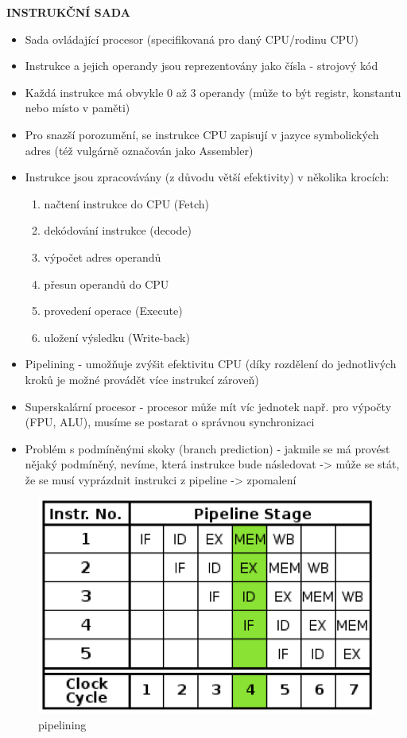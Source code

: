 \documentclass[10pt,a4paper]{article}
\begin{document}
\textbf{INSTRUKČNÍ SADA}
\begin{itemize}
	\item Sada ovládající procesor (specifikovaná pro daný CPU/rodinu CPU)
	\item Instrukce a jejich operandy jsou reprezentovány jako čísla - strojový kód
	\item Každá instrukce má obvykle 0 až 3 operandy (může to být registr, konstantu nebo místo v paměti)
	\item Pro snazší porozumění, se instrukce CPU zapisují v jazyce symbolických adres (též vulgárně označován jako Assembler)
	\item Instrukce jsou zpracovávány (z důvodu větší efektivity) v několika krocích:
	\begin{enumerate}
		\item načtení instrukce do CPU (Fetch)
		\item dekódování instrukce (decode)
		\item výpočet adres operandů
		\item přesun operandů do CPU
		\item provedení operace (Execute)
		\item uložení výsledku (Write-back)
	\end{enumerate}
	\item Pipelining - umožňuje zvýšit efektivitu CPU (díky rozdělení do jednotlivých kroků je možné provádět více instrukcí zároveň)
	\item Superskalární procesor - procesor může mít víc jednotek např. pro výpočty (FPU, ALU), musíme se postarat o správnou synchronizaci
	\item Problém s podmíněnými skoky (branch prediction) - jakmile se má provést nějaký podmíněný, nevíme, která instrukce bude následovat -> může se stát, že se musí vyprázdnit instrukci z pipeline -> zpomalení
\end{itemize}

\begin{figure} [h]
		\includegraphics[scale=0.7]{img/pipelining.png}
		\caption{pipelining}	
\end{figure}
\end{document}
